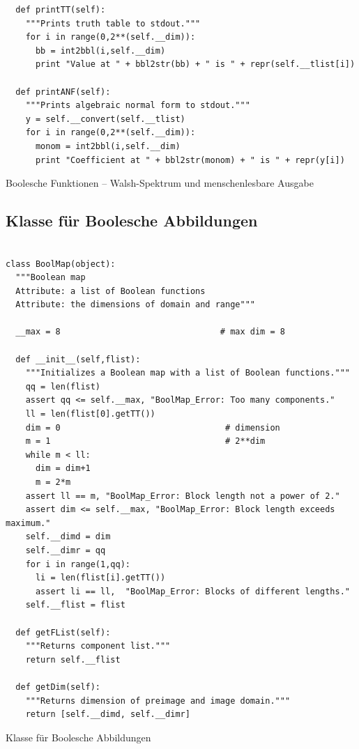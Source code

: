 \begin{refsegment}
\begin{sagecode}
\begin{verbatim}
  def printTT(self):
    """Prints truth table to stdout."""
    for i in range(0,2**(self.__dim)):
      bb = int2bbl(i,self.__dim)
      print "Value at " + bbl2str(bb) + " is " + repr(self.__tlist[i])

  def printANF(self):
    """Prints algebraic normal form to stdout."""
    y = self.__convert(self.__tlist)
    for i in range(0,2**(self.__dim)):
      monom = int2bbl(i,self.__dim)
      print "Coefficient at " + bbl2str(monom) + " is " + repr(y[i])
\end{verbatim}
\caption{Boolesche Funktionen -- Walsh-Spektrum
   und menschenlesbare Ausgabe}\label{Sage-code-bool-bool-f2}
\end{sagecode}
\clearpage

\subsection{Klasse für Boolesche
   Abbildungen}\label{ss-bool-map}

\begin{sagecode}
\begin{verbatim}

class BoolMap(object):
  """Boolean map
  Attribute: a list of Boolean functions
  Attribute: the dimensions of domain and range"""

  __max = 8                                # max dim = 8

  def __init__(self,flist):
    """Initializes a Boolean map with a list of Boolean functions."""
    qq = len(flist)
    assert qq <= self.__max, "BoolMap_Error: Too many components."
    ll = len(flist[0].getTT())
    dim = 0                                 # dimension
    m = 1                                   # 2**dim
    while m < ll:
      dim = dim+1
      m = 2*m
    assert ll == m, "BoolMap_Error: Block length not a power of 2."
    assert dim <= self.__max, "BoolMap_Error: Block length exceeds maximum."
    self.__dimd = dim
    self.__dimr = qq
    for i in range(1,qq):
      li = len(flist[i].getTT())
      assert li == ll,  "BoolMap_Error: Blocks of different lengths."
    self.__flist = flist

  def getFList(self):
    """Returns component list."""
    return self.__flist

  def getDim(self):
    """Returns dimension of preimage and image domain."""
    return [self.__dimd, self.__dimr]
\end{verbatim}
\caption{Klasse für Boolesche Abbildungen}\label{Sage-code-bool-bool-map}
\end{sagecode}


\end{refsegment}
